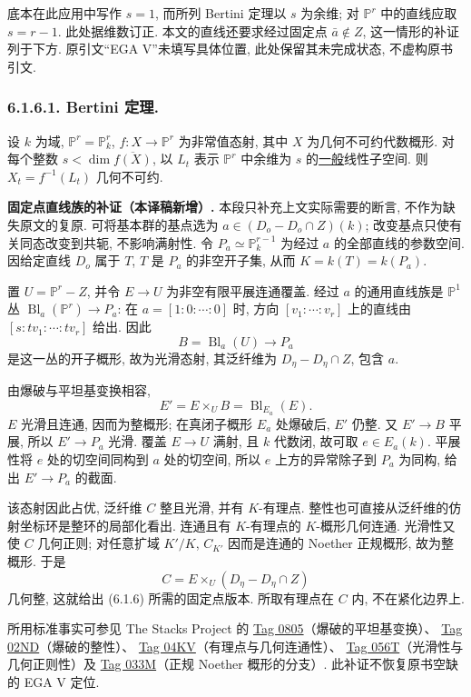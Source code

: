 \begin{editorialnote}
底本在此应用中写作 $s=1$, 而所列 Bertini 定理以 $s$ 为余维; 对 $\mathbb P^r$ 中的直线应取 $s=r-1$. 此处据维数订正. 本文的直线还要求经过固定点 $\bar a\notin Z$, 这一情形的补证列于下方. 原引文“EGA V”未填写具体位置, 此处保留其未完成状态, 不虚构原书引文.
\end{editorialnote}

\subsubsection*{6.1.6.1. Bertini 定理.}
设 $k$ 为域, $\mathbb P^r=\mathbb P^r_k$, $f:X\to\mathbb P^r$ 为非常值态射, 其中 $X$ 为几何不可约代数概形. 对每个整数 $s<\dim\overline{f(X)}$, 以 $L_t$ 表示 $\mathbb P^r$ 中余维为 $s$ 的\underline{一般}线性子空间. 则 $X_t=f^{-1}(L_t)$ 几何不可约.


\begin{editorialnote}
\textbf{固定点直线族的补证（本译稿新增）.}
本段只补充上文实际需要的断言, 不作为缺失原文的复原. 可将基本群的基点选为 $a\in(D_o-D_o\cap Z)(k)$; 改变基点只使有关同态改变到共轭, 不影响满射性. 令 $P_a\simeq\mathbb P^{r-1}_k$ 为经过 $a$ 的全部直线的参数空间. 因给定直线 $D_o$ 属于 $T$, $T$ 是 $P_a$ 的非空开子集, 从而 $K=k(T)=k(P_a)$.

置 $U=\mathbb P^r-Z$, 并令 $E\to U$ 为非空有限平展连通覆盖. 经过 $a$ 的通用直线族是 $\mathbb P^1$ 丛 $\operatorname{Bl}_a(\mathbb P^r)\to P_a$: 在 $a=[1:0:\cdots:0]$ 时, 方向 $[v_1:\cdots:v_r]$ 上的直线由 $[s:t v_1:\cdots:t v_r]$ 给出. 因此
\[
B=\operatorname{Bl}_a(U)\longrightarrow P_a
\]
是这一丛的开子概形, 故为光滑态射, 其泛纤维为 $D_\eta-D_\eta\cap Z$, 包含 $a$.

由爆破与平坦基变换相容,
\[
E'=E\times_U B=\operatorname{Bl}_{E_a}(E).
\]
$E$ 光滑且连通, 因而为整概形; 在真闭子概形 $E_a$ 处爆破后, $E'$ 仍整. 又 $E'\to B$ 平展, 所以 $E'\to P_a$ 光滑. 覆盖 $E\to U$ 满射, 且 $k$ 代数闭, 故可取 $e\in E_a(k)$. 平展性将 $e$ 处的切空间同构到 $a$ 处的切空间, 所以 $e$ 上方的异常除子到 $P_a$ 为同构, 给出 $E'\to P_a$ 的截面.

该态射因此占优, 泛纤维 $C$ 整且光滑, 并有 $K$-有理点. 整性也可直接从泛纤维的仿射坐标环是整环的局部化看出. 连通且有 $K$-有理点的 $K$-概形几何连通. 光滑性又使 $C$ 几何正则; 对任意扩域 $K'/K$, $C_{K'}$ 因而是连通的 Noether 正规概形, 故为整概形. 于是
\[
C=E\times_U(D_\eta-D_\eta\cap Z)
\]
几何整, 这就给出 (6.1.6) 所需的固定点版本. 所取有理点在 $C$ 内, 不在紧化边界上.

所用标准事实可参见 The Stacks Project 的
\href{https://stacks.math.columbia.edu/tag/0805}{Tag 0805}（爆破的平坦基变换）、
\href{https://stacks.math.columbia.edu/tag/02ND}{Tag 02ND}（爆破的整性）、
\href{https://stacks.math.columbia.edu/tag/04KV}{Tag 04KV}（有理点与几何连通性）、
\href{https://stacks.math.columbia.edu/tag/056T}{Tag 056T}（光滑性与几何正则性）及
\href{https://stacks.math.columbia.edu/tag/033M}{Tag 033M}（正规 Noether 概形的分支）. 此补证不恢复原书空缺的 EGA V 定位.
\end{editorialnote}
